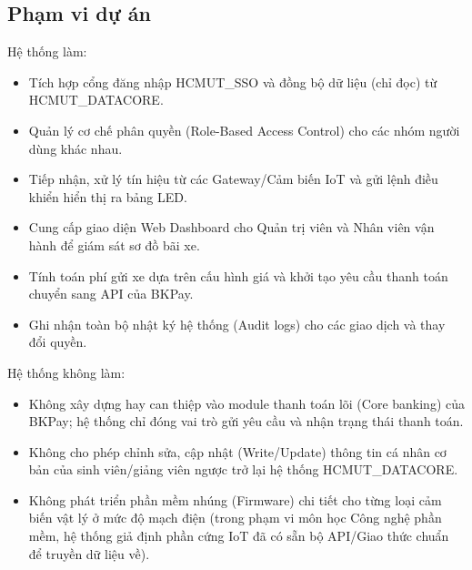 \subsection{Phạm vi dự án}
Hệ thống làm:
\begin{itemize}
    \item Tích hợp cổng đăng nhập HCMUT\_SSO và đồng bộ dữ liệu (chỉ đọc) từ HCMUT\_DATACORE.
    \item Quản lý cơ chế phân quyền (Role-Based Access Control) cho các nhóm người dùng khác nhau.
    \item Tiếp nhận, xử lý tín hiệu từ các Gateway/Cảm biến IoT và gửi lệnh điều khiển hiển thị ra bảng LED.
    \item Cung cấp giao diện Web Dashboard cho Quản trị viên và Nhân viên vận hành để giám sát sơ đồ bãi xe.
    \item Tính toán phí gửi xe dựa trên cấu hình giá và khởi tạo yêu cầu thanh toán chuyển sang API của BKPay.
    \item Ghi nhận toàn bộ nhật ký hệ thống (Audit logs) cho các giao dịch và thay đổi quyền.
\end{itemize}

Hệ thống không làm:
\begin{itemize}
    \item Không xây dựng hay can thiệp vào module thanh toán lõi (Core banking) của BKPay; hệ thống chỉ đóng vai trò gửi yêu cầu và nhận trạng thái thanh toán.
    \item Không cho phép chỉnh sửa, cập nhật (Write/Update) thông tin cá nhân cơ bản của sinh viên/giảng viên ngược trở lại hệ thống HCMUT\_DATACORE.
    \item Không phát triển phần mềm nhúng (Firmware) chi tiết cho từng loại cảm biến vật lý ở mức độ mạch điện (trong phạm vi môn học Công nghệ phần mềm, hệ thống giả định phần cứng IoT đã có sẵn bộ API/Giao thức chuẩn để truyền dữ liệu về).
\end{itemize}

